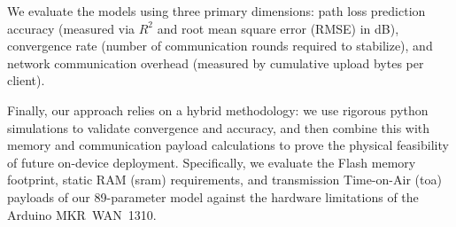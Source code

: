 We evaluate the models using three primary dimensions: path loss prediction accuracy (measured via $R^2$ and root mean square error (RMSE) in dB), convergence rate (number of communication rounds required to stabilize), and network communication overhead (measured by cumulative upload bytes per client). 

Finally, our approach relies on a hybrid methodology: we use rigorous python simulations to validate convergence and accuracy, and then combine this with memory and communication payload calculations to prove the physical feasibility of future on-device deployment. Specifically, we evaluate the Flash memory footprint, static RAM (\gls{sram}) requirements, and transmission Time-on-Air (\gls{toa}) payloads of our 89-parameter model against the hardware limitations of the Arduino MKR~WAN~1310.
